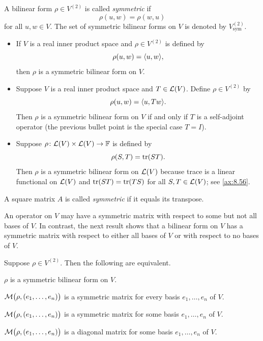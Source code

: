 \begin{definition}\label{ax:9.9}
A bilinear form $\rho\in V^{(2)}$ is called \emph{symmetric} if
\[ \rho(u,w) = \rho(w,u) \]
for all $u,w\in V$. The set of symmetric bilinear forms on $V$ is denoted by
$V_{\mathrm{sym}}^{(2)}$.
\end{definition}

\begin{example}\label{ax:9.10}\leavevmode
\begin{itemize}
\item If $V$ is a real inner product space and $\rho\in V^{(2)}$ is defined by
  \[ \rho(u,w) = \langle u, w \rangle, \]
  then $\rho$ is a symmetric bilinear form on $V$.
\item Suppose $V$ is a real inner product space and $T\in\mathcal{L}(V)$. Define
  $\rho\in V^{(2)}$ by
  \[ \rho(u,w) = \langle u, Tw \rangle. \]
  Then $\rho$ is a symmetric bilinear form on $V$ if and only if $T$ is a
  self-adjoint operator (the previous bullet point is the special case $T=I$).
\item Suppose $\rho\colon\mathcal{L}(V)\times\mathcal{L}(V)\to\mathbb{F}$ is defined by
  \[ \rho(S,T) = \operatorname{tr}(ST). \]
  Then $\rho$ is a symmetric bilinear form on $\mathcal{L}(V)$ because trace is a
  linear functional on $\mathcal{L}(V)$ and $\operatorname{tr}(ST)=\operatorname{tr}(TS)$ for all
  $S,T\in\mathcal{L}(V)$; see \ref{ax:8.56}.
\end{itemize}
\end{example}

\begin{definition}\label{ax:9.11}
A square matrix $A$ is called \emph{symmetric} if it equals its transpose.
\end{definition}

An operator on $V$ may have a symmetric matrix with respect to some but not all
bases of $V$. In contrast, the next result shows that a bilinear form on $V$ has
a symmetric matrix with respect to either all bases of $V$ or with respect to no
bases of $V$.

\begin{result}\label{ax:9.12}
Suppose $\rho\in V^{(2)}$. Then the following are equivalent.
\begin{parts}
\item $\rho$ is a symmetric bilinear form on $V$.
\item $\mathcal{M}\bigl(\rho,(e_1,\dots,e_n)\bigr)$ is a symmetric matrix for every
  basis $e_1,\dots,e_n$ of $V$.
\item $\mathcal{M}\bigl(\rho,(e_1,\dots,e_n)\bigr)$ is a symmetric matrix for some
  basis $e_1,\dots,e_n$ of $V$.
\item $\mathcal{M}\bigl(\rho,(e_1,\dots,e_n)\bigr)$ is a diagonal matrix for some
  basis $e_1,\dots,e_n$ of $V$.
\end{parts}
\end{result}

